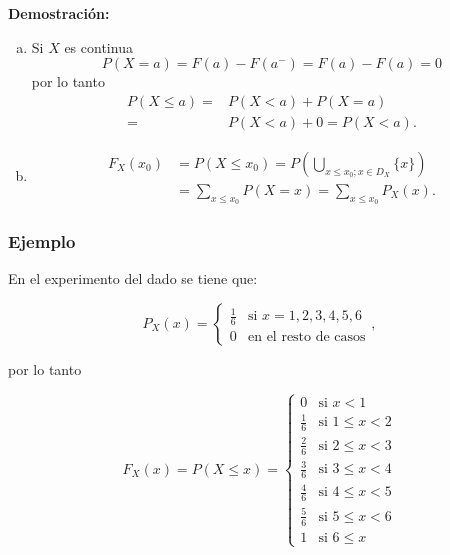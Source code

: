 \documentclass[handout]{beamer}\usepackage[]{graphicx}\usepackage[]{color}
\renewcommand{\leq}{\leqslant}
\theoremstyle{plain}
\theoremstyle{definition}
\begin{document}
\begin{frame}

\textbf{Demostración:}


\begin{enumerate}[a)]
\item Si $X$ es continua $$P(X=a)=F(a)-F(a^{-})=F(a)-F(a)=0$$
por lo tanto 
\begin{equation*}
\begin{split}
P(X\leq a)=& P(X<a)+P(X=a)\\
=& P(X<a)+0= P(X<a).
\end{split}
\end{equation*}
\item 
\begin{eqnarray*}
F_{X}(x_{0})&=P(X\leq x_{0})=P\left(\bigcup_{x\leq
x_{0}; x\in D_X} \{x\}\right)\\
&=\sum_{x\leq x_{0}}P(X=x)= \sum_{x\leq x_{0}}P_{X}(x).
\end{eqnarray*}
\end{enumerate}
\end{frame}


\begin{frame}
\frametitle{Ejemplo}
   En el experimento del dado se tiene que:

   $$P_{X}(x)=\left\{\begin{array}{ll}
   \frac{1}{6} & \mbox{si } x=1,2,3,4,5,6\\
   0 & \mbox{en el resto de casos}\end{array}\right.,$$

por lo tanto

   $$F_{X}(x)=P(X\leq x)=\left\{\begin{array}{ll}
   0 & \mbox{si } x<1\\
   \frac{1}{6} &\mbox{si } 1\leq x<2\\
   \frac{2}{6} &\mbox{si } 2\leq x<3\\
   \frac{3}{6} &\mbox{si } 3\leq x<4\\
   \frac{4}{6} &\mbox{si } 4\leq x<5\\
   \frac{5}{6} &\mbox{si } 5\leq x<6\\
   1 &\mbox{si } 6\leq x\end{array}\right.$$
\end{frame}
\end{document}
